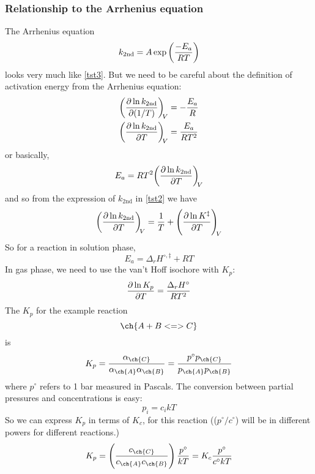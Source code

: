 \subsubsection{Relationship to the Arrhenius equation}
The Arrhenius equation
\begin{equation}
  k_{\text{2nd}}=A\exp \left(\frac{-E_a}{RT} \right)
\end{equation}
looks very much like \cref{tst3}. But we need to be careful about the definition of activation energy from the Arrhenius equation:
\begin{equation}
\begin{aligned}
  \diffp{\ln k_{\text{2nd}}}{(1/T)}[V]&=-\frac{E_a}{R}\\
  \diffp{\ln k_{\text{2nd}}}{T}[V]&=\frac{E_a}{RT^2}
\end{aligned}
\end{equation}
or basically, 
\begin{equation}
\label{tst4}
  E_a=RT^2\diffp{\ln k_{\text{2nd}}}{T}[V]
\end{equation}
and so from the expression of $k_{\text{2nd}}$ in \cref{tst2} we have
\begin{equation}
\label{tst5}
  \diffp{\ln k_{\text{2nd}}}{T}[V]=\frac{1}{T}+\diffp{\ln K^{\ddag}}{T}[V]
\end{equation}
So for a reaction in solution phase, 
\begin{equation}
  E_a=\Delta_rH^{\circ,\ddag}+RT
\end{equation}
In gas phase, we need to use the van't Hoff isochore with $K_p$:
\begin{equation}
  \diffp{\ln K_p}{T}=\frac{\Delta_rH^{\circ}}{RT^2}
\end{equation}
The $K_p$ for the example reaction
\begin{equation*}
  \ch{A + B <=> C}
\end{equation*}
is 
\begin{equation}
  K_p=\frac{\alpha_{\ch{C}}}{\alpha_{\ch{A}}\alpha_{\ch{B}}}=\frac{p^{\circ}p_{\ch{C}}}{p_{\ch{A}}p_{\ch{B}}}
\end{equation}
where $p^{\circ} $ refers to 1 bar measured in Pascals. The conversion between partial pressures and concentrations is easy:
\begin{equation}
  p_i=c_ikT
\end{equation}
So we can express $K_p$ in terms of $K_c$, for this reaction (($p^{\circ}/c^{\circ}$) will be in different powers for different reactions.)
\begin{equation}
  K_p=\lf(\frac{c_{\ch{C}}}{c_{\ch{A}}c_{\ch{B}}} \rt)\frac{p^{\circ}}{kT}=K_c\frac{p^{\circ}}{c^{\circ}kT}
\end{equation}
